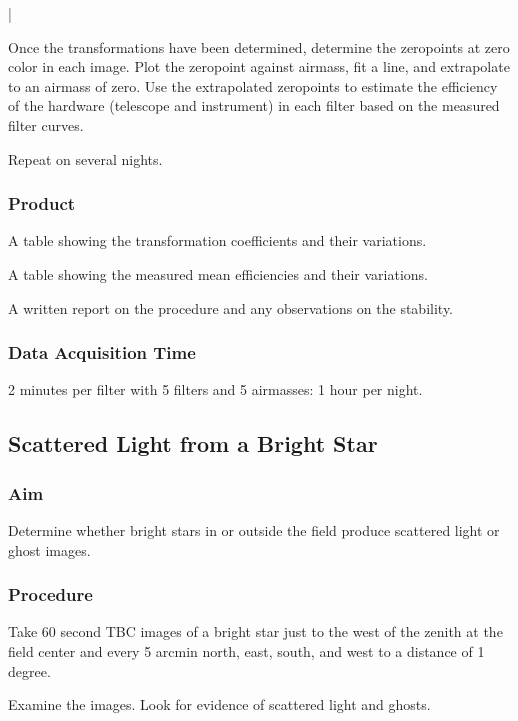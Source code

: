 |\documentclass{article}
\begin{document}
Once the transformations have been determined, determine the zeropoints at zero color in each image. Plot the zeropoint against airmass, fit a line, and extrapolate to an airmass of zero. Use the extrapolated zeropoints to estimate the efficiency of the hardware (telescope and instrument) in each filter based on the measured filter curves.

Repeat on several nights.

\subsubsection{Product}

A table showing the transformation coefficients and their variations.

A table showing the measured mean efficiencies and their variations.

A written report on the procedure and any observations on the stability.

\subsubsection{Data Acquisition Time}

2 minutes per filter with 5 filters and 5 airmasses: 1 hour per night.


\subsection{Scattered Light from a Bright Star}

\subsubsection{Aim}

Determine whether bright stars in or outside the field produce scattered light or ghost images.

\subsubsection{Procedure}

Take 60 second TBC images of a bright star just to the west of the zenith at the field center and every 5 arcmin north, east, south, and west to a distance of 1 degree.

Examine the images. Look for evidence of scattered light and ghosts.
\end{document}
